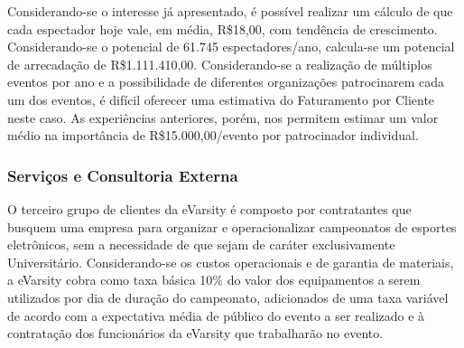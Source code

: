 \documentclass[a4paper, 12pt]{paper}
\begin{document}
Considerando-se o interesse já apresentado, é possível realizar um cálculo de que cada espectador hoje vale, em média, R\$18,00, com tendência de crescimento. Considerando-se o potencial de 61.745 espectadores/ano, calcula-se um potencial de arrecadação de R\$1.111.410,00. Considerando-se a realização de múltiplos eventos por ano e a possibilidade de diferentes organizações patrocinarem cada um dos eventos, é difícil oferecer uma estimativa do Faturamento por Cliente neste caso.
As experiências anteriores, porém, nos permitem estimar um valor médio na importância de R\$15.000,00/evento por patrocinador individual.

\subsubsection{Serviços e Consultoria Externa}
\label{servcons}
O terceiro grupo de clientes da eVarsity é composto por contratantes que busquem uma empresa para organizar e operacionalizar campeonatos de esportes eletrônicos, sem a necessidade de que sejam de caráter exclusivamente Universitário. Considerando-se os custos operacionais e de garantia de materiais, a eVarsity cobra como taxa básica 10\% do valor dos equipamentos a serem utilizados por dia de duração do campeonato, adicionados de uma taxa variável de acordo com a expectativa média de público do evento a ser realizado e à contratação dos funcionários da eVarsity que trabalharão no evento.
\end{document}
